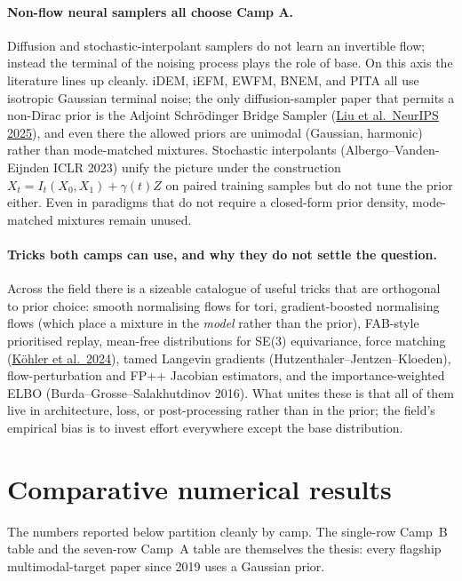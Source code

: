 \documentclass[11pt,letterpaper]{article}
\theoremstyle{plain}
\begin{document}
\paragraph{Non-flow neural samplers all choose Camp A.} Diffusion and
stochastic-interpolant samplers do not learn an invertible flow; instead
the terminal of the noising process plays the role of base. On this axis
the literature lines up cleanly. iDEM, iEFM, EWFM, BNEM, and PITA all use
isotropic Gaussian terminal noise; the only diffusion-sampler paper that
permits a non-Dirac prior is the Adjoint Schrödinger Bridge Sampler
(\href{https://arxiv.org/abs/2506.22565}{Liu et al.\ NeurIPS 2025}), and
even there the allowed priors are unimodal (Gaussian, harmonic) rather than
mode-matched mixtures. Stochastic interpolants (Albergo--Vanden-Eijnden
ICLR 2023) unify the picture under the construction
$X_t = I_t(X_0,X_1) + \gamma(t)Z$ on paired training samples but do not
tune the prior either. Even in paradigms that do not require a closed-form
prior density, mode-matched mixtures remain unused.

\paragraph{Tricks both camps can use, and why they do not settle the
question.} Across the field there is a sizeable catalogue of useful tricks
that are orthogonal to prior choice: smooth normalising flows for tori,
gradient-boosted normalising flows (which place a mixture in the
\emph{model} rather than the prior), FAB-style prioritised replay, mean-free
distributions for SE(3) equivariance, force matching
(\href{https://arxiv.org/abs/2401.04246}{Köhler et al.\ 2024}), tamed
Langevin gradients (Hutzenthaler--Jentzen--Kloeden), flow-perturbation and
FP++ Jacobian estimators, and the importance-weighted ELBO
(Burda--Grosse--Salakhutdinov 2016). What unites these is that all of them
live in architecture, loss, or post-processing rather than in the prior; the
field's empirical bias is to invest effort everywhere except the base
distribution.

\section{Comparative numerical results}

The numbers reported below partition cleanly by camp. The single-row Camp~B
table and the seven-row Camp~A table are themselves the thesis: every
flagship multimodal-target paper since 2019 uses a Gaussian prior.
\end{document}
